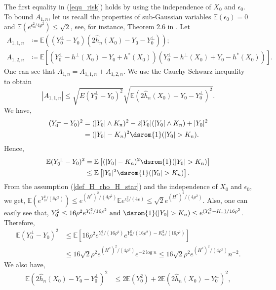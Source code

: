 \documentclass[10pt,twoside]{article}
\numberwithin{equation}{section}
\newcommand{\E}{\ensuremath{\mathbb{E}}}
\def \ind{\textrm{\dsrom{1}}}
\begin{document}
%
The first equality in (\ref{equ_risk}) holds by using the independence of $X_0$ and $\epsilon_0$.
%
To bound $A_ {1, n} $,  let us recall the properties of sub-Gaussian  variables  $ \E (\epsilon_0) = 0$ and $\E (e^ {\epsilon_0^2/4\rho^2}) \leq \sqrt{2} $, see, for instance, Theorem 2.6 in \cite{wainwright2019high}. 
%
Let 
%
\begin{align*}
A_ {1, 1, n} & \coloneqq \E \left((Y_0^ {\bot} - Y_0)(2\widehat{h}_n (X_0) - Y_0 - Y_0^ {\bot}) \right);  
\\
A_ {1, 2, n}  & \coloneqq \E \left[(Y_0^ {\bot} -h^ {\bot} (X_0) - Y_0 + h^ {*}(X_0) )(Y_0^ {\bot} - h^ {\bot} (X_0) + Y_0 - h ^{*} (X_0) ) \right]. 
\end{align*}
%
One can see that $A_ {1, n} = A_ {1, 1, n} + A_ {1, 2, n} $.  We use the Cauchy-Schwarz inequality to obtain 
%
\[ |A_ {1, 1, n}| \leq \sqrt{E(Y_0^ {\bot} - Y_0)^2} \sqrt{ \E (2 \widehat{h}_n (X_0) - Y_0 - Y_0^ {\bot})^2}.   \]
%
We have,
%
\begin{align*}
(Y_0^ {\bot} - Y_0)^2 & = (|Y_0| \land K_ {n})^2 - 2 |Y_0| (|Y_0| \land K_ {n}) + |Y_0|^2
\\
& = (|Y_0|  - K_ {n})^2 \ind{(|Y_0| > K_ {n})}.
\end{align*}
%
Hence, 
%
\begin{align}\label{equ_Bd}
\E (Y_0^{\bot} - Y_0)^2  \nonumber & = \E \left[ (|Y_0| - K_n)^2 \ind{(|Y_0| > K_n)} \right]
\\
 & \leq  \E \left[ |Y_0|^2 \ind{(|Y_0|> K_n)}  \right].  
 \end{align}
 From the assumption (\ref{def_H_rho_H_star}) and the independence of $X_0$ and $\epsilon_0$, we get,
 $ \E (e^ {Y_0^2/(8 \rho^2)}) \leq e^ {(H^ {*}) ^2/(4 \rho^2)} \E e^{\epsilon_0^2 / (4\rho)} \leq \sqrt{2} e^ {(H^ {*}) ^2/(4 \rho^2)} $.
 Also, one can easily see that, $ Y_0^2 \leq 16 \rho^2 e^ {Y_0^2 /16\rho^2} ~ \text{and} ~ \ind{(|Y_0| > K_n)} \leq  e^ {(Y_0^2 - K_n) /16 \rho^2} $.
 Therefore,
 \begin{align}
\E(Y_0^ {\bot} - Y_0) ^2  \nonumber & \leq \E \left[16 \rho^2 e^ {Y_0^2 /(16 \rho^2)} e^ {Y_0^2/(16 \rho^2) - K_n^2 /(16 \rho^2)} \right] 
\\
 &  \leq 16 \sqrt{2} \rho^2 e^ {(H^ {*}) ^2 /(4 \rho^2)} e^ {-2 \log n} \leq 16 \sqrt{2} \rho^2 e^ {(H^ {*}) ^2 /(4 \rho^2)} n^ {-2}. 
\end{align}
%
We also have, 
%
\begin{align}\label{equ_Bd2}
\E(2 \widehat{h}_n (X_0) - Y_0 - Y_0^ {\bot}) ^2 \nonumber & \leq 2 \E(Y_0^2) + 2 \E (2 \widehat{h}_n (X_0) - Y_0^ {\bot}) ^2,
\end{align}
\end{document}
